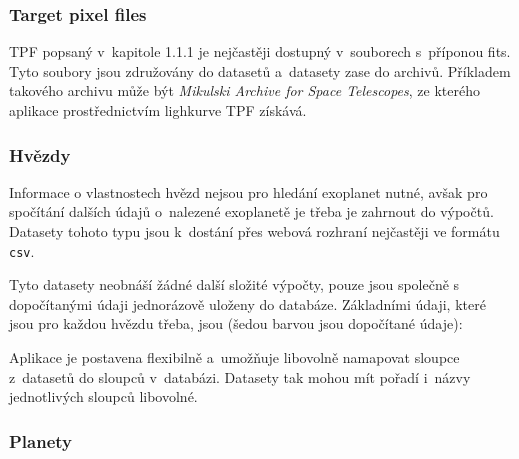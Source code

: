 \documentclass[a4paper,12pt]{article}
\def\code#1{\texttt{#1}}
\begin{document}
{{{{{{{{\subsubsection{Target pixel files}

TPF popsaný v~kapitole 1.1.1 je nejčastěji dostupný v~souborech s~příponou fits. Tyto soubory jsou združovány do datasetů a~datasety zase do archivů. Příkladem takového archivu může být \textit{Mikulski Archive for Space Telescopes}, ze kterého aplikace prostřednictvím lighkurve TPF získává.

\subsubsection{Hvězdy}

Informace o vlastnostech hvězd nejsou pro hledání exoplanet nutné, avšak pro spočítání dalších údajů o~nalezené exoplanetě je třeba je zahrnout do výpočtů. Datasety tohoto typu jsou k~dostání přes webová rozhraní nejčastěji ve formátu \code{csv}.


Tyto datasety neobnáší žádné další složité výpočty, pouze jsou společně s dopočítanými údaji jednorázově uloženy do databáze. Základními údaji, které jsou pro každou hvězdu třeba, jsou (šedou barvou jsou dopočítané údaje):


Aplikace je postavena flexibilně a~umožňuje libovolně namapovat sloupce z~datasetů do sloupců v~databázi. Datasety tak mohou mít pořadí i~názvy jednotlivých sloupců libovolné.


\subsubsection{Planety}

}}}}}}}}
\end{document}
